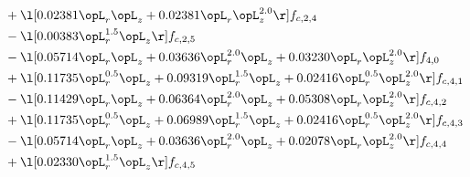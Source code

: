 \begin{alignat}{2}
& + \l[  0.02381 \opL_r \opL_z +  0.02381 \opL_r \opL_z^{2.0}  \r] f_{c,2,4} \nonumber \\ 
& - \l[  0.00383 \opL_r^{1.5} \opL_z  \r] f_{c,2,5} \nonumber \\ 
& - \l[  0.05714 \opL_r \opL_z +  0.03636 \opL_r^{2.0} \opL_z +  0.03230 \opL_r \opL_z^{2.0}  \r] f_{4,0} \nonumber \\ 
& + \l[  0.11735 \opL_r^{0.5} \opL_z +  0.09319 \opL_r^{1.5} \opL_z +  0.02416 \opL_r^{0.5} \opL_z^{2.0}  \r] f_{c,4,1} \nonumber \\ 
& - \l[  0.11429 \opL_r \opL_z +  0.06364 \opL_r^{2.0} \opL_z +  0.05308 \opL_r \opL_z^{2.0}  \r] f_{c,4,2} \nonumber \\ 
& + \l[  0.11735 \opL_r^{0.5} \opL_z +  0.06989 \opL_r^{1.5} \opL_z +  0.02416 \opL_r^{0.5} \opL_z^{2.0}  \r] f_{c,4,3} \nonumber \\ 
& - \l[  0.05714 \opL_r \opL_z +  0.03636 \opL_r^{2.0} \opL_z +  0.02078 \opL_r \opL_z^{2.0}  \r] f_{c,4,4} \nonumber \\ 
& + \l[  0.02330 \opL_r^{1.5} \opL_z  \r] f_{c,4,5} \nonumber \\ 
\end{alignat} 


